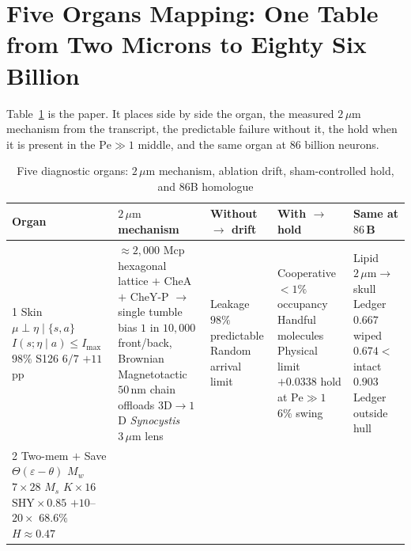 \documentclass[12pt,a4paper]{article}
\newcommand{\Pe}{\mathrm{Pe}}
\begin{document}
\section{Five Organs Mapping: One Table from Two Microns to Eighty Six Billion}
\label{sec:mapping}

Table~\ref{tab:five} is the paper. It places side by side the organ, the measured $2\,\mu\mathrm{m}$ mechanism from the transcript, the predictable failure without it, the hold when it is present in the $\Pe \gg 1$ middle, and the same organ at $86$ billion neurons.

\begin{table}[H]
\centering
\caption{Five diagnostic organs: $2\,\mu\mathrm{m}$ mechanism, ablation drift, sham-controlled hold, and $86$B homologue}
\label{tab:five}
\small
\begin{tabular}{p{2.6cm} p{3.0cm} p{2.6cm} p{2.6cm} p{2.6cm}}
\toprule
\textbf{Organ} & \textbf{$2\,\mu\mathrm{m}$ mechanism} & \textbf{Without $\to$ drift} & \textbf{With $\to$ hold} & \textbf{Same at $86$\,B} \\
\midrule
1 Skin \newline $\mu \perp \eta \mid \{s,a\}$ \newline $I(s;\eta\mid a)\leq I_{\max}$ \newline $98\%$ S126 $6/7$ $+11$pp &
$\approx 2{,}000$ Mcp hexagonal lattice $+$ CheA $+$ CheY-P $\to$ single tumble bias \newline $1$ in $10{,}000$ front/back, Brownian \newline Magnetotactic $50$\,nm chain offloads $3$D${}\to{}1$D \newline \emph{Synocystis} $3\,\mu\mathrm{m}$ lens &
Leakage $98\%$ predictable \newline Random arrival limit &
Cooperative $<1\%$ occupancy \newline Handful molecules \newline Physical limit \newline $+0.0338$ hold at $\Pe\gg1$ \newline $6\%$ swing &
Lipid $2\,\mu\mathrm{m}\to$ skull \newline Ledger $0.667$ wiped $0.674 <$ intact $0.903$ \newline Ledger outside hull \\
\midrule
2 Two-mem $+$ Save \newline $\Theta(\varepsilon-\theta)$ \newline $M_w$ $7{\times}28$ \newline $M_s$ $K{\times}16$ \newline $\mathrm{SHY}{\times}0.85$ \newline $+10$--$20\times$ \newline $68.6\%$ $H{\approx}0.47$ &

\end{tabular}
\end{table}
\end{document}
